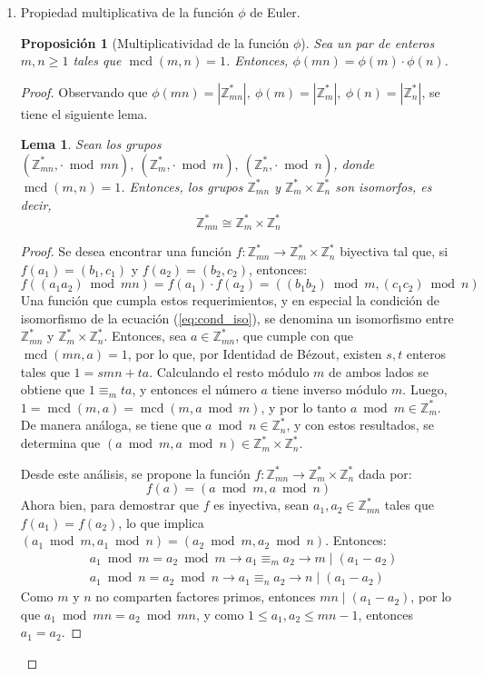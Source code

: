 \documentclass[hidelinks, 12pt]{article}
\newcommand{\Zs}{\mathbb{Z}^*}
\DeclareMathOperator{\mcd}{mcd}
\newcommand{\ra}{\rightarrow}
\newtheorem{lemma}{Lema}[section]
\newtheorem*{proposition}{Proposición}
\begin{document}
\begin{enumerate}
    \item Propiedad multiplicativa de la función $\phi$ de Euler. \\
    \begin{proposition}[Multiplicatividad de la función $\phi$]
        Sea un par de enteros $m,n\geq 1$ tales que $\mcd(m,n)=1$. Entonces, $\phi(mn)=\phi(m)\cdot\phi(n)$.
    \end{proposition}
    \begin{proof}
        Observando que $\phi(mn)=|\Zs_{mn}|,~\phi(m)=|\Zs_m|,~\phi(n)=|\Zs_n|$, se tiene el siguiente lema.
        \begin{lemma}
        \label{le:3.1}
            Sean los grupos $(\Zs_{mn},\cdot\bmod mn),~(\Zs_{m},\cdot\bmod m),~(\Zs_{n},\cdot\bmod n)$, donde $\mcd(m,n)=1$. Entonces, los grupos $\Zs_{mn}$ y $\Zs_m\times\Zs_n$ son isomorfos, es decir, 
            \[\Zs_{mn}\cong\Zs_m\times\Zs_n\]
        \end{lemma}
        \begin{proof}
            \renewcommand\qedsymbol{$\blacksquare$}
            Se desea encontrar una función $f:\Zs_{mn}\ra\Zs_m\times\Zs_n$ biyectiva tal que, si $f(a_1)=(b_1,c_1)$ y $f(a_2)=(b_2,c_2)$, entonces:
            \begin{equation}
                f((a_1a_2)\bmod mn)=f(a_1)\cdot f(a_2)=((b_1b_2)\bmod m,(c_1c_2)\bmod n)
                \label{eq:cond_iso}
            \end{equation}
            Una función que cumpla estos requerimientos, y en especial la condición de isomorfismo de la ecuación (\ref{eq:cond_iso}), se denomina un isomorfismo entre $\Zs_{mn}$ y $\Zs_m\times\Zs_n$.
            Entonces, sea $a\in\Zs_{mn}$, que cumple con que $\mcd(mn,a)=1$, por lo que, por Identidad de Bézout, existen $s,t$ enteros tales que $1=smn+ta$. Calculando el resto módulo $m$ de ambos lados se obtiene que $1\equiv_mta$, y entonces el número $a$ tiene inverso módulo $m$. Luego, $1=\mcd(m,a)=\mcd(m,a\bmod m)$, y por lo tanto $a\bmod m\in\Zs_m$. De manera análoga, se tiene que $a\bmod n\in\Zs_n$, y con estos resultados, se determina que $(a\bmod m,a\bmod n)\in\Zs_m\times\Zs_n$.

            Desde este análisis, se propone la función $f:\Zs_{mn}\ra\Zs_m\times\Zs_n$ dada por: \[f(a)=(a\bmod m,a\bmod n)\]
            Ahora bien, para demostrar que $f$ es inyectiva, sean $a_1,a_2\in\Zs_{mn}$ tales que $f(a_1)=f(a_2)$, lo que implica $(a_1\bmod m,a_1\bmod n)=(a_2\bmod m,a_2\bmod n)$. Entonces:
            \begin{align*}
                &a_1\bmod m=a_2\bmod m\ra a_1\equiv_m a_2\ra m\mid(a_1-a_2) \\
                &a_1\bmod n=a_2\bmod n\ra a_1\equiv_n a_2\ra n\mid(a_1-a_2)
            \end{align*}
            Como $m$ y $n$ no comparten factores primos, entonces $mn\mid(a_1-a_2)$, por lo que $a_1\bmod mn=a_2\bmod mn$, y como $1\leq a_1,a_2\leq mn-1$, entonces $a_1=a_2$.


\end{proof}
\end{proof}
\end{enumerate}
\end{document}
